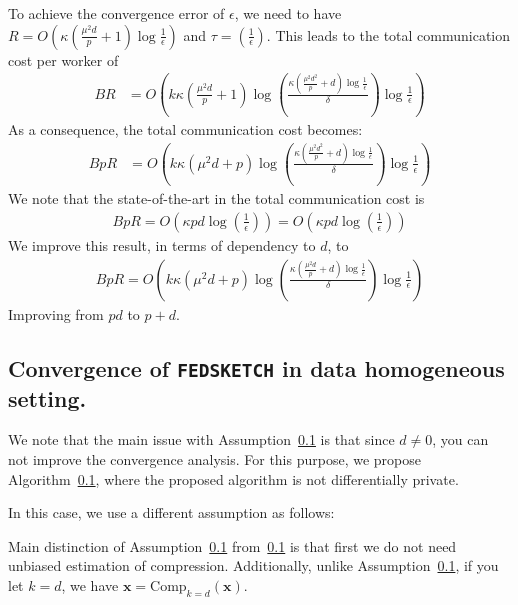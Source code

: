 {\begin{corollary}
To achieve the convergence error of $\epsilon$, we need to have $R=O\left(\kappa(\frac{\mu^2d}{p}+1)\log\frac{1}{\epsilon}\right)$ and $\tau=\left(\frac{1}{\epsilon}\right)$. This leads to the total communication cost per worker of 
\begin{align}
BR&=O\left(k\kappa(\frac{\mu^2d}{p}+1)\log\left(\frac{\kappa(\frac{\mu^2d^2}{p}+d)\log\frac{1}{\epsilon}}{\delta}\right)\log\frac{1}{\epsilon} \right)
\end{align}
As a consequence, the total communication cost becomes:
\begin{align}
BpR&=O\left(k\kappa(\mu^2d+p)\log\left(\frac{\kappa(\frac{\mu^2d^2}{p}+d)\log\frac{1}{\epsilon}}{\delta}\right)\log\frac{1}{\epsilon} \right)
\end{align}
We note that the state-of-the-art in \cite{karimireddy2019scaffold} the total communication cost is 
\begin{align}
    BpR=O\left(\kappa pd\log\left(\frac{1}{\epsilon}\right) \right)=O\left(\kappa pd\log\left(\frac{1}{\epsilon}\right)\right) 
\end{align}
We improve this result, in terms of dependency to $d$, to 
\begin{align}
    BpR=O\left(k\kappa(\mu^2d+p)\log\left(\frac{\kappa(\frac{\mu^2d}{p}+d)\log\frac{1}{\epsilon}}{\delta}\right)\log\frac{1}{\epsilon} \right)
\end{align}
Improving from $pd$ to $p+d$.
\end{corollary}

}

\subsection{Convergence of \texttt{FEDSKETCH} in data homogeneous setting.} 

We note that the main issue with Assumption~\ref{} is that since $d\neq 0$, you can not improve the convergence analysis. For this purpose, we propose Algorithm~\ref{}, where the proposed algorithm is not differentially private.

In this case, we use a different assumption as follows:

\begin{remark}
Main distinction of Assumption~\ref{} from~\ref{} is that first we do not need unbiased estimation of compression. Additionally, unlike Assumption~\ref{}, if you let $k=d$, we have $\boldsymbol{x}=\text{Comp}_{k=d}(\boldsymbol{x})$.    
\end{remark}




